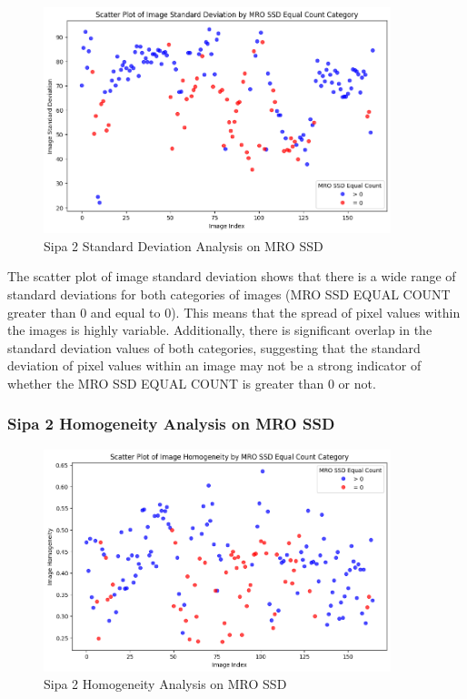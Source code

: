 \begin{figure}[ht]
    \centering
    \includegraphics[width=0.9\textwidth]{Figures/Results/sipa_02/sd.png}
    \caption[Sipa 2 Standard Deviation Analysis on MRO SSD]{Sipa 2 Standard Deviation Analysis on MRO SSD}
    \label{fig:Sipa 2 Standard Deviation Analysis on MRO SSD}
\end{figure}

The scatter plot of image standard deviation shows that there is a wide range of standard deviations for both categories of images (MRO SSD EQUAL COUNT greater than 0 and equal to 0). This means that the spread of pixel values within the images is highly variable. Additionally, there is significant overlap in the standard deviation values of both categories, suggesting that the standard deviation of pixel values within an image may not be a strong indicator of whether the MRO SSD EQUAL COUNT is greater than 0 or not.


\newpage

\subsubsection{Sipa 2 Homogeneity Analysis on MRO SSD}


\begin{figure}[ht]
    \centering
    \includegraphics[width=0.9\textwidth]{Figures/Results/sipa_02/homogeneity.png}
    \caption[Sipa 2 Homogeneity Analysis on MRO SSD]{Sipa 2 Homogeneity Analysis on MRO SSD}
    \label{fig:Sipa 2 Homogeneity Analysis on MRO SSD}
\end{figure}


